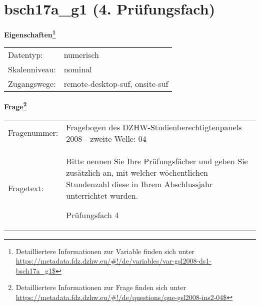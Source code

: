 
    \setcounter{footnote}{0}

    \vspace*{-1.8cm}
	\section{bsch17a\_g1 (4. Prüfungsfach)}
	\label{section:bsch17a_g1}



    \vspace*{0.5cm}
    \noindent\textbf{Eigenschaften\footnote{Detailliertere Informationen zur Variable finden sich unter
		\url{https://metadata.fdz.dzhw.eu/\#!/de/variables/var-gsl2008-ds1-bsch17a_g1$}}}\\
	\begin{tabularx}{\hsize}{@{}lX}
	Datentyp: & numerisch \\
	Skalenniveau: & nominal \\
	Zugangswege: &
	  remote-desktop-suf, 
	  onsite-suf
 \\
    \end{tabularx}



				\vspace*{0.5cm}
                \noindent\textbf{Frage\footnote{Detailliertere Informationen zur Frage finden sich unter
		              \url{https://metadata.fdz.dzhw.eu/\#!/de/questions/que-gsl2008-ins2-04$}}}\\
				\begin{tabularx}{\hsize}{@{}lX}
					Fragenummer: &
					  Fragebogen des DZHW-Studienberechtigtenpanels 2008 - zweite Welle:
					  04
 \\
					Fragetext: & Bitte nennen Sie Ihre Prüfungsfächer und geben Sie zusätzlich an, mit welcher wöchentlichen Stundenzahl diese in Ihrem Abschlussjahr unterrichtet wurden.\par  Prüfungsfach 4 \\
				\end{tabularx}





